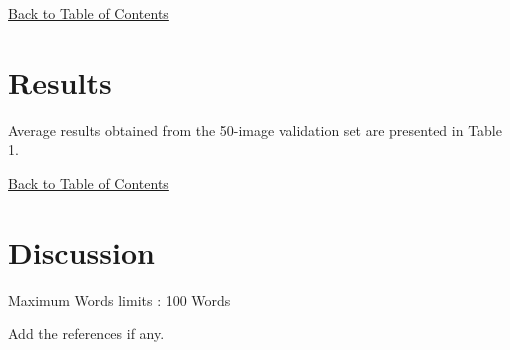 \documentclass[12pt,a4paper]{article}
\begin{document}
\hyperref[contents]{\small Back to Table of Contents}
\newpage
\section{Results}
Average results obtained from the 50-image validation set are presented in Table 1.


\hyperref[contents]{\small Back to Table of Contents}
\newpage
\section{Discussion}
{Maximum Words limits : 100 Words}



 

Add the references if any.
\end{document}
